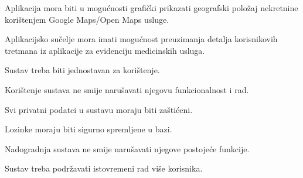 			 \begin{packed_item}
                \item Aplikacija mora biti u mogućnosti grafički prikazati geografski položaj nekretnine korištenjem Google Maps/Open Maps usluge.
                \item Aplikacijsko sučelje mora imati mogućnost preuzimanja detalja korisnikovih tretmana iz aplikacije za evidenciju medicinskih usluga.
                \item Sustav treba biti jednostavan za korištenje.
                \item Korištenje sustava ne smije narušavati njegovu funkcionalnost i rad.
                \item Svi privatni podatci u sustavu moraju biti zaštićeni.
                \item Lozinke moraju biti sigurno spremljene u bazi.
                \item Nadogradnja sustava ne smije narušavati njegove postojeće funkcije.
                \item Sustav treba podržavati istovremeni rad više korisnika.
		  	\end{packed_item}
			 
			 
	